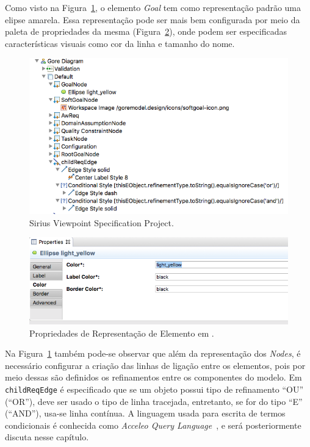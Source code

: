 Como visto na Figura~\ref{exemplo-sirius-vsp}, o elemento \textit{Goal} tem como representação padrão uma elipse amarela. Essa representação pode ser mais bem configurada por meio da paleta de propriedades da mesma (Figura~\ref{figura-propriedades-personalizacao}), onde podem ser especificadas características visuais como cor da linha e tamanho do nome.

\begin{figure}
	\centering
	\includegraphics[width=1\textwidth]{figuras/unagi/exemplo-sirius-vsp.png}
	\caption{Sirius Viewpoint Specification Project.}
	\label{exemplo-sirius-vsp}
\end{figure}

\begin{figure}
	\centering
	\includegraphics[width=1\textwidth]{figuras/unagi/exemplo-propriedades-personalizacao.png}
	\caption{Propriedades de Representação de Elemento em \sirius.}
	\label{figura-propriedades-personalizacao}
\end{figure}

Na Figura~\ref{exemplo-sirius-vsp} também pode-se observar que além da representação dos \textit{Nodes}, é necessário configurar a criação das linhas de ligação entre os elementos, pois por meio dessas são definidos os refinamentos entre os componentes do modelo. Em \texttt{childReqEdge} é especificado que se um objeto possui tipo de refinamento ``OU'' (``OR''), deve ser usado o tipo de linha tracejada, entretanto, se for do tipo ``E'' (``AND''), usa-se linha contínua. A linguagem usada para escrita de termos condicionais é conhecida como \textit{Acceleo Query Language}~\cite{musset2006acceleo}, e será posteriormente discuta nesse capítulo.

